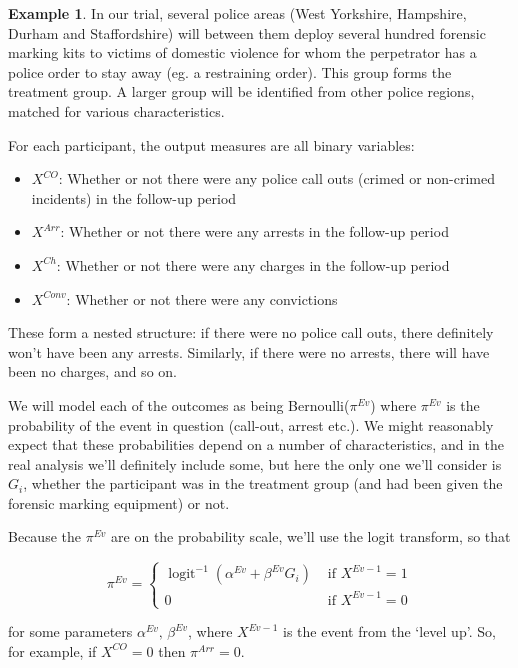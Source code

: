 \documentclass[
  openany]{book}
\providecommand{\tightlist}{%
  \setlength{\itemsep}{0pt}\setlength{\parskip}{0pt}}
\theoremstyle{definition}
\theoremstyle{definition}
\newtheorem{example}{Example}[chapter]
\theoremstyle{definition}
\theoremstyle{definition}
\theoremstyle{remark}
\begin{document}
\begin{example}
In our trial, several police areas (West Yorkshire, Hampshire, Durham and Staffordshire) will between them deploy several hundred forensic marking kits to victims of domestic violence for whom the perpetrator has a police order to stay away (eg. a restraining order). This group forms the treatment group. A larger group will be identified from other police regions, matched for various characteristics.

For each participant, the output measures are all binary variables:

\begin{itemize}
\tightlist
\item
  \(X^{CO}\): Whether or not there were any police call outs (crimed or non-crimed incidents) in the follow-up period
\item
  \(X^{Arr}\): Whether or not there were any arrests in the follow-up period
\item
  \(X^{Ch}\): Whether or not there were any charges in the follow-up period
\item
  \(X^{Conv}\): Whether or not there were any convictions
\end{itemize}

These form a nested structure: if there were no police call outs, there definitely won't have been any arrests. Similarly, if there were no arrests, there will have been no charges, and so on.

We will model each of the outcomes as being Bernoulli(\(\pi^{Ev}\)) where \(\pi^{Ev}\) is the probability of the event in question (call-out, arrest etc.). We might reasonably expect that these probabilities depend on a number of characteristics, and in the real analysis we'll definitely include some, but here the only one we'll consider is \(G_i\), whether the participant was in the treatment group (and had been given the forensic marking equipment) or not.

Because the \(\pi^{Ev}\) are on the probability scale, we'll use the logit transform, so that

\[
\pi^{Ev} = 
\begin{cases}
\operatorname{logit}^{-1}\left( \alpha^{Ev} + \beta^{Ev}G_i\right) & \text{ if }X^{Ev-1}=1\\
0 & \text{ if } X^{Ev-1}=0
\end{cases}
\]

for some parameters \(\alpha^{Ev},\,\beta^{Ev}\), where \(X^{Ev-1}\) is the event from the `level up'. So, for example, if \(X^{CO}=0\) then \(\pi^{Arr}=0\).


\end{example}
\end{document}
